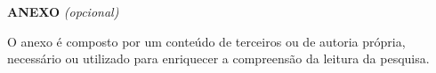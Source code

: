 \begin{center}
\textbf{ANEXO} \textit{(opcional)}
\end{center}

O anexo é composto por um conteúdo de terceiros ou de autoria própria, necessário ou utilizado para enriquecer a compreensão da leitura da pesquisa.